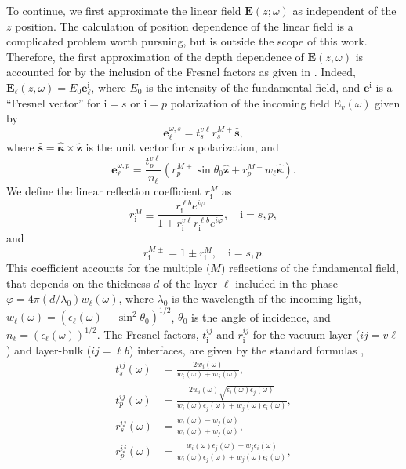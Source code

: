 \documentclass[utf8]{frontiersSCNS}
\begin{document}
To continue, we first approximate the linear field $\mathbf{E}(z;\omega)$ as
independent of the $z$ position. The calculation of position dependence of the
linear field is a complicated problem worth pursuing, but is outside the scope
of this work. Therefore, the first approximation of the depth dependence of
$\mathbf{E}(z,\omega)$ is accounted for by the inclusion of the Fresnel factors
as given in \cite{andersonPRB16b}. Indeed, $\mathbf{E}_{\ell}(z,\omega) =
E_{0}\mathbf{e}^{\mathrm{i}}_{\ell}$, where $E_{0}$ is the intensity of the
fundamental field, and $\mathbf{e}^{\mathrm{i}}$ is a ``Fresnel  vector'' for
$\mathrm{i} = s$ or $\mathrm{i} = p$ polarization of the incoming field
$\mathrm{E}_v(\omega)$ given by
\begin{equation}\label{eq:mcves}
\mathbf{e}^{\omega,s}_{\ell} = t^{v\ell}_{s}r^{M+}_{s}\mathbf{\hat{s}},
\end{equation}
where $\mathbf{\hat{s}} = \hat{\boldsymbol{\kappa}}\times\mathbf{\hat{z}}$ is
the unit vector for $s$ polarization, and
\begin{equation}\label{eq:mcvep}
\mathbf{e}^{\omega,p}_{\ell} = \frac{t^{v\ell}_{p}}{n_{\ell}}
\left(
  r^{M+}_{p}\sin\theta_{0}\mathbf{\hat{z}}
+ r^{M-}_{p}w_{\ell}\hat{\boldsymbol{\kappa}}
\right).
\end{equation} 
We define the linear reflection coefficient $r^{M}_{\mathrm{i}}$ as
\begin{equation}\label{mvrm}
r^{M}_{\mathrm{i}} \equiv 
\frac{r^{\ell b}_{\mathrm{i}}e^{i\varphi}}{1+r^{v\ell}_{\mathrm{i}}
r^{\ell b}_{\mathrm{i}}e^{i\varphi}}, \quad \mathrm{i}=s,p,
\end{equation}
and
\begin{equation}\label{eq:mvc}
r^{M\pm}_{\mathrm{i}} = 1\pm r^{M}_{\mathrm{i}},\quad \mathrm{i} = s,p.
\end{equation}
This coefficient accounts for the multiple ($M$) reflections of the fundamental
field, that depends on the thickness $d$ of the layer $\ell$ included in the
phase $\varphi = 4\pi(d/\lambda_{0})w_{\ell}(\omega)$, where $\lambda_{0}$ is
the wavelength of the incoming light, $w_{\ell}(\omega) =
(\epsilon_{\ell}(\omega) - \sin^{2}\theta_{0})^{1/2}$, $\theta_{0}$ is the angle
of incidence, and $n_{\ell} = (\epsilon_{\ell}(\omega))^{1/2}$. The Fresnel
factors, $t^{ij}_{\mathrm{i}}$ and $r^{ij}_{\mathrm{i}}$ for the vacuum-layer
($ij = v\ell$) and layer-bulk ($ij = \ell b$) interfaces, are given by the
standard formulas \citep{jacksonbook},
\begin{equation}\label{eq:e.f1}
\begin{split}
t_{s}^{ij}(\omega) &=
\frac{2w_{i}(\omega)}{w_{i}(\omega) + w_{j}(\omega)},\\
t_{p}^{ij}(\omega) &=
\frac{2w_{i}(\omega)\sqrt{\epsilon_{i}(\omega)\epsilon_j(\omega)}}
     {w_{i}(\omega)\epsilon_{j}(\omega) + w_{j}(\omega)\epsilon_{i}(\omega)},\\
r_{s}^{ij}(\omega) &=
\frac{w_{i}(\omega) - w_{j}(\omega)}
     {w_{i}(\omega) + w_{j}(\omega)},\\
r_{p}^{ij}(\omega) &=
\frac{w_{i}(\omega)\epsilon_{j}(\omega) - w_{j}\epsilon_{i}(\omega)}
     {w_{i}(\omega)\epsilon_{j}(\omega) + w_{j}(\omega)\epsilon_{i}(\omega)}, 
\end{split}
\end{equation}
\end{document}
